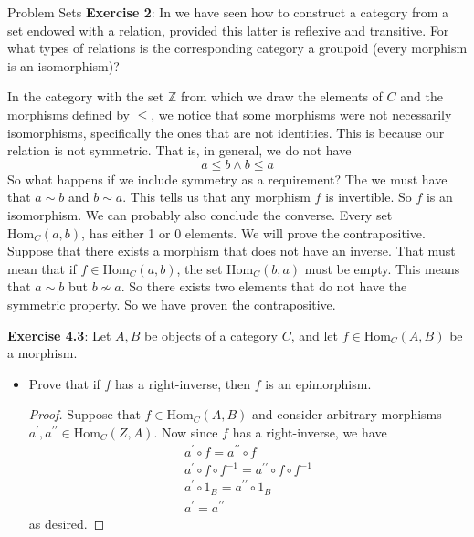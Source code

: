 \documentclass{report}
\begin{document}
\begin{exercises}{Problem Sets}
    \textbf{Exercise 2}: In  we have seen how to construct a category from a set endowed with a relation, provided this latter is reflexive and transitive. For what types of relations is the corresponding category a groupoid (every morphism is an isomorphism)?
        \begin{answer}
            In the category with the set $\mathbb{Z}$ from which we draw the elements of $C$ and the morphisms defined by $\leq $, we notice that some morphisms were not necessarily isomorphisms, specifically the ones that are not identities. This is because our relation is not symmetric. That is, in general, we do not have
                \begin{equation*}
                    a \leq b \land b \leq a
                \end{equation*}
            So what happens if we include symmetry as a requirement? The we must have that $a \sim b$ and $b \sim a$. This tells us that any morphism $f$ is invertible. So $f$ is an isomorphism. We can probably also conclude the converse. Every set $\text{Hom}_{C}(a, b)$, has either 1 or 0 elements. We will prove the contrapositive. Suppose that there exists a morphism that does not have an inverse. That must mean that if $f \in \text{Hom}_{C}(a, b)$, the set $\text{Hom}_{C}(b, a)$ must be empty. This means that $a \sim b$ but $b \not\sim a$. So there exists two elements that do not have the symmetric property. So we have proven the contrapositive.
        \end{answer}

    \textbf{Exercise 4.3}: Let $A, B$ be objects of a category $C$, and let $f \in \text{Hom}_{C}(A, B)$ be a morphism. 
        \begin{itemize}
            \item Prove that if $f$ has a right-inverse, then $f$ is an epimorphism.
                \begin{proof}
                    Suppose that $f \in \text{Hom}_{C}(A, B)$ and consider arbitrary morphisms $a^{\prime}, a^{\prime\prime} \in \text{Hom}_{C}(Z, A)$. Now since $f$ has a right-inverse, we have
                        \begin{gather*}
                            a^{\prime} \circ f = a^{\prime\prime} \circ f \\
                            a^{\prime} \circ f \circ f^{-1} = a^{\prime\prime} \circ f \circ f^{-1} \\
                            a^{\prime} \circ 1_{B} = a^{\prime\prime} \circ 1_{B} \\
                            a^{\prime} = a^{\prime\prime}
                        \end{gather*}
                    as desired.
                \end{proof}


\end{itemize}
\end{exercises}
\end{document}
